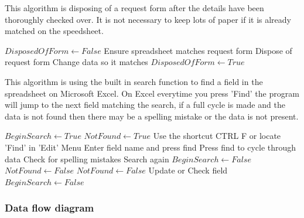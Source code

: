 This algorithm is disposing of a request form after the details have been thoroughly checked over. It is not necessary to keep lots of paper if it is already matched on the speedsheet.

\begin{algorithm}[H]
\begin{algorithmic}
\State $DisposedOfForm  \leftarrow False$
	\State Ensure spreadsheet matches request form
		\State Dispose of request form
	\Else
		\State Change data so it matches 
\State $DisposedOfForm \leftarrow True$
\EndIf
\EndWhile
\end{algorithmic}
\end{algorithm}

This algorithm is using the built in search function to find a field in the spreadsheet on Microsoft Excel. On Excel everytime you press 'Find' the program will jump to the next field matching the search, if a full cycle is made and the data is not found then there may be a spelling mistake or the data is not present.

\begin{algorithm}[H]
\begin{algorithmic}
\State$BeginSearch \leftarrow True$
\State$NotFound \leftarrow True$
	\State Use the shortcut CTRL F or locate 'Find' in 'Edit' Menu
	\State Enter field name and press find
		\State Press find to cycle through data
			\State Check for spelling mistakes
			\State Search again
			\State $BeginSearch \leftarrow False$
			\State $NotFound \leftarrow False$
		\Else
			\State $NotFound \leftarrow False$
		\EndIf
	\EndWhile
	\State Update or Check field
	$BeginSearch \leftarrow False$
\EndWhile

\end{algorithmic}
\end{algorithm}
		

\subsubsection{Data flow diagram}

